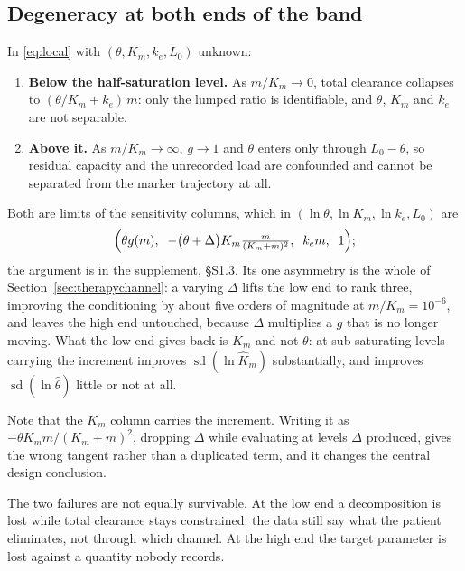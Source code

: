\subsection{Degeneracy at both ends of the band}

\begin{proposition}
\label{prop:excitation}
In \eqref{eq:local} with $(\theta, K_m, k_e, L_0)$ unknown:
\begin{enumerate}[leftmargin=*, itemsep=2pt]
\item \textbf{Below the half-saturation level.} As $m/K_m \to 0$, total clearance collapses
to $(\theta/K_m + k_e)\,m$: only the lumped ratio is identifiable, and $\theta$, $K_m$ and
$k_e$ are not separable.
\item \textbf{Above it.} As $m/K_m \to \infty$, $g \to 1$ and $\theta$ enters only through
$L_0 - \theta$, so residual capacity and the unrecorded load are confounded and cannot be
separated from the marker trajectory at all.
\end{enumerate}
\end{proposition}

Both are limits of the sensitivity columns, which in
$(\ln\theta, \ln K_m, \ln k_e, L_0)$ are
\begin{equation}
\Bigl(\theta g(m),\;\; -\bigl(\theta + \Delta\bigr) K_m \tfrac{m}{(K_m+m)^2},\;\;
k_e m, \;\; 1 \Bigr);
\label{eq:columns}
\end{equation}
the argument is in the supplement, \S S1.3. Its one asymmetry is the whole of
Section~\ref{sec:therapychannel}: a varying $\Delta$ lifts the low end to rank three,
improving the conditioning by about five orders of magnitude at $m/K_m = 10^{-6}$, and
leaves the high end untouched, because $\Delta$ multiplies a $g$ that is no longer moving.
What the low end gives back is $K_m$ and not $\theta$: at sub-saturating levels carrying
the increment improves $\operatorname{sd}(\ln\hat K_m)$ substantially, and improves
$\operatorname{sd}(\ln\hat\theta)$ little or not at all.

Note that the $K_m$ column carries the increment. Writing it as
$-\theta K_m m/(K_m+m)^2$, dropping $\Delta$ while evaluating at levels $\Delta$ produced,
gives the wrong tangent rather than a duplicated term, and it changes the central design
conclusion.

The two failures are not equally survivable. At the low end a decomposition is lost while
total clearance stays constrained: the data still say what the patient eliminates, not
through which channel. At the high end the target parameter is lost against a quantity
nobody records.

